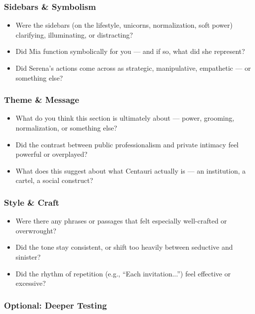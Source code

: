 \subsubsection{Sidebars \& Symbolism}

\begin{itemize}
  \item Were the sidebars (on the lifestyle, unicorns, normalization, soft power) clarifying, illuminating, or distracting?
  \item Did Mia function symbolically for you — and if so, what did she represent?
  \item Did Serena’s actions come across as strategic, manipulative, empathetic — or something else?
\end{itemize}

\subsubsection{Theme \& Message}

\begin{itemize}
  \item What do you think this section is ultimately about — power, grooming, normalization, or something else?
  \item Did the contrast between public professionalism and private intimacy feel powerful or overplayed?
  \item What does this suggest about what Centauri actually is — an institution, a cartel, a social construct?
\end{itemize}

\subsubsection{Style \& Craft}

\begin{itemize}
  \item Were there any phrases or passages that felt especially well-crafted or overwrought?
  \item Did the tone stay consistent, or shift too heavily between seductive and sinister?
  \item Did the rhythm of repetition (e.g., “Each invitation...”) feel effective or excessive?
\end{itemize}

\subsubsection{Optional: Deeper Testing}

